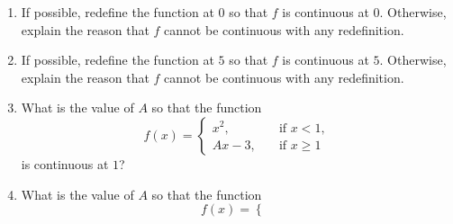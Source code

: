 \documentclass[11pt]{book}
\theoremstyle{break}
\theoremstyle{no_label}
\numberwithin{equation}{section}
\begin{document}
\begin{enumerate}[label=\arabic*.]
\begin{enumerate}
    \end{enumerate}
    \item If possible, redefine the function at $0$ so that $f$ is continuous at $0$. Otherwise, explain the reason that $f$ cannot be continuous with any redefinition.
    \begin{enumerate}
    \end{enumerate}
    \item If possible, redefine the function at $5$ so that $f$ is continuous at $5$. Otherwise, explain the reason that $f$ cannot be continuous with any redefinition.
    \begin{enumerate}
    \end{enumerate}
    \item What is the value of $A$ so that the function $$f(x)=\left\{\begin{array}{rl}
        x^2, \quad & \text{if $x<1$},\\
        Ax-3, \quad & \text{if $x\geq1$}
    \end{array}\right.$$ is continuous at $1$?
    \item What is the value of $A$ so that the function $$f(x)=\left\{\begin{array}{rl}

\end{array}$$
\end{enumerate}
\end{document}
